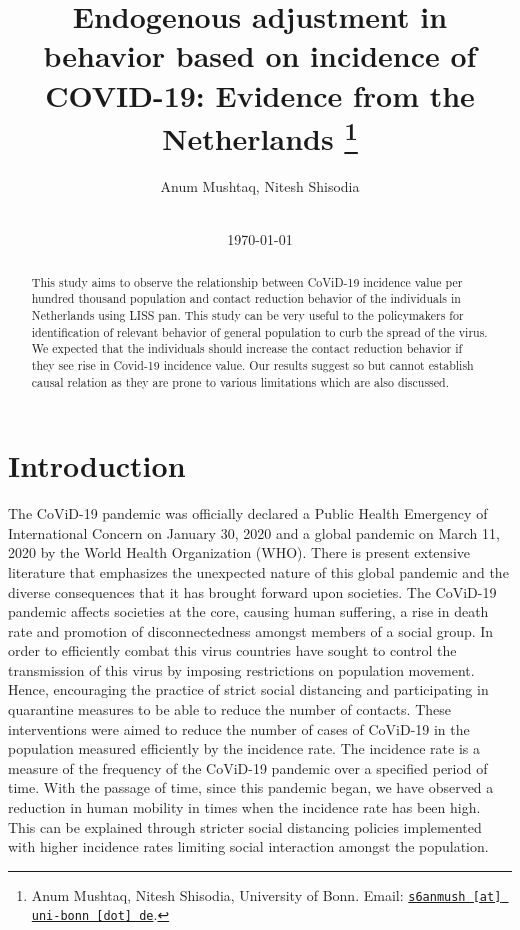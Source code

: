 \documentclass[11pt, a4paper, leqno]{article}
\begin{document}
\title{Endogenous adjustment in behavior based on incidence of COVID-19: Evidence from the Netherlands
\thanks{Anum Mushtaq, Nitesh Shisodia, University of Bonn. Email: \href{mailto:s6anmush@uni-bonn.de}{\nolinkurl{s6anmush [at] uni-bonn [dot] de}}.}}

\author{Anum Mushtaq, Nitesh Shisodia}

\date{
    \\[1ex]
    \today
}

\maketitle


\begin{abstract}
This study aims to observe the relationship between CoViD-19 incidence value per hundred thousand population and contact reduction behavior of the individuals in Netherlands using LISS pan. This study can be very useful to the policymakers for identification of relevant behavior of general population to curb the spread of the virus. We expected that the individuals should increase the contact reduction behavior if they see rise in Covid-19 incidence value. Our results suggest so but cannot establish causal relation as they are prone to various limitations which are also discussed.
    
\end{abstract}
\clearpage

\section{Introduction} %
\label{sec:introduction}
The CoViD-19 pandemic was officially declared a Public Health Emergency of International Concern on January 30, 2020 and a global pandemic on March 11, 2020 by the World Health Organization (WHO). There is present extensive literature that emphasizes the unexpected nature of this global pandemic and the diverse consequences that it has brought forward upon societies. The  CoViD-19 pandemic affects societies at the core, causing human suffering, a rise in death rate and promotion of disconnectedness amongst members of a social group. In order to efficiently combat this virus countries have sought to control the transmission of this virus by imposing restrictions on population movement. Hence, encouraging the practice of strict social distancing and participating in quarantine measures to be able to reduce the number of contacts. These interventions were aimed to reduce the number of cases of CoViD-19 in the population measured efficiently by the incidence rate. The incidence rate is a measure of the frequency of the CoViD-19 pandemic over a specified period of time. With the passage of time, since this pandemic began, we have observed a reduction in human mobility in times when the incidence rate has been high. This can be explained through stricter social distancing policies implemented with higher incidence rates limiting social interaction amongst the population. 
\end{document}
